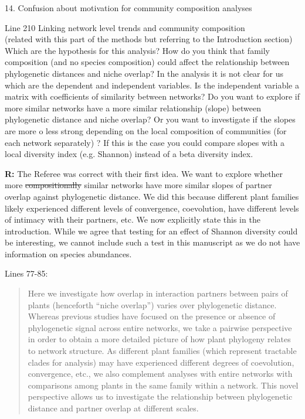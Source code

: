 \documentclass[12pt]{letter}
\newenvironment{refquote}{\bigskip \begin{it}}{\end{it}\smallskip}
\providecommand{\DIFdel}[1]{{\protect\color{red}\sout{#1}}}                      %
\providecommand{\DIFdelbegin}{} %
\providecommand{\DIFdelend}{} %
\newcommand{\DIFscaledelfig}{0.5}
\newlength{\DIFdelgraphicswidth} %
\newlength{\DIFdelgraphicsheight} %
\newcommand{\DIFdelincludegraphics}[2][]{%
\sbox{\DIFdelgraphicsbox}{\DIFOincludegraphics[#1]{#2}}%
\settoboxwidth{\DIFdelgraphicswidth}{\DIFdelgraphicsbox} %
\settoboxtotalheight{\DIFdelgraphicsheight}{\DIFdelgraphicsbox} %
\scalebox{\DIFscaledelfig}{%
\parbox[b]{\DIFdelgraphicswidth}{\usebox{\DIFdelgraphicsbox}\\[-\baselineskip] \rule{\DIFdelgraphicswidth}{0em}}\llap{\resizebox{\DIFdelgraphicswidth}{\DIFdelgraphicsheight}{%
\setlength{\unitlength}{\DIFdelgraphicswidth}%
\begin{picture}(1,1)%
\thicklines\linethickness{2pt} %
{\color[rgb]{1,0,0}\put(0,0){\framebox(1,1){}}}%
{\color[rgb]{1,0,0}\put(0,0){\line( 1,1){1}}}%
{\color[rgb]{1,0,0}\put(0,1){\line(1,-1){1}}}%
\end{picture}%
}\hspace*{3pt}}} %
} %
\DeclareRobustCommand{\DIFdelbegin}{\DIFOdelbegin \let\includegraphics\DIFdelincludegraphics} %
\DeclareRobustCommand{\DIFdelend}{\DIFOaddend \let\includegraphics\DIFOincludegraphics} %
\begin{document}


	14. Confusion about motivation for community composition analyses 

		\begin{refquote}
			Line 210 Linking network level trends and community composition\\

			(related with this part of the methods but referring to the Introduction section) Which are the hypothesis for this analysis? How do you think that family composition (and no species composition) could affect the relationship between phylogenetic  distances and niche overlap?
			In the analysis it is not clear for us which are the dependent and independent variables. Is the independent variable a matrix with coefficients of similarity between networks?  Do you want to explore if more similar networks have a more similar relationship (slope) between phylogenetic distance and niche overlap? Or you want to investigate if the slopes are more o less strong depending on the local composition of communities (for each network separately) ? If this is the case you could compare slopes with a local diversity index (e.g. Shannon) instead of a beta diversity index.
		\end{refquote}


		\textbf{R:} The Referee was correct with their first idea. We want to explore whether more \DIFdelbegin \DIFdel{compositionally }\DIFdelend similar networks have more similar slopes of partner overlap against phylogenetic distance. We did this because different plant families likely experienced different levels of convergence, coevolution, have different levels of intimacy with their partners, etc. We now explicitly state this in the introduction. While we agree that testing for an effect of Shannon diversity could be interesting, we cannot include such a test in this manuscript as we do not have information on species abundances.


		Lines 77-85:

		\begin{quotation}

			Here we investigate how overlap in interaction partners between 
			pairs of plants (henceforth ``niche overlap'') varies over 
			phylogenetic distance. 
			Whereas previous 
			studies have focused on the presence or absence of phylogenetic
			signal across entire networks, we take a pairwise perspective in
			order to obtain a more detailed picture of how plant phylogeny
			relates to network structure. As different plant families (which represent tractable clades for analysis) may have experienced different degrees of coevolution, convergence, etc., we also complement analyses with entire networks with comparisons among plants in the same family within a network. 
			This novel perspective allows us to investigate the relationship between phylogenetic distance and partner overlap at different scales. 

  		\end{quotation}
\end{document}
